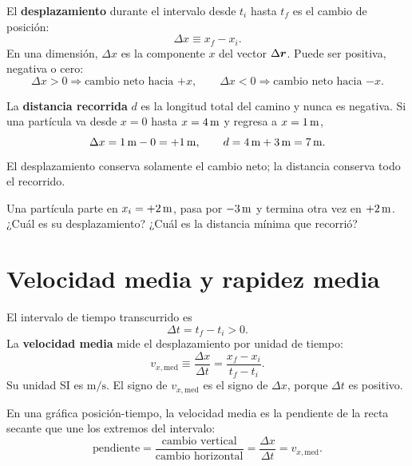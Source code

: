 \documentclass[11pt]{article}
\begin{document}
El \textbf{desplazamiento} durante el intervalo desde \(t_i\) hasta \(t_f\) es
el cambio de posición:
\[
  \Delta x
  \equiv
  x_f-x_i.
\]
En una dimensión, \(\Delta x\) es la componente \(x\) del vector
\(\Delta\boldsymbol{r}\). Puede ser positiva, negativa o cero:
\[
  \Delta x>0
  \Rightarrow
  \text{cambio neto hacia \(+x\)},
  \qquad
  \Delta x<0
  \Rightarrow
  \text{cambio neto hacia \(-x\)}.
\]

La \textbf{distancia recorrida} \(d\) es la longitud total del camino y nunca
es negativa. Si una partícula va desde \(x=0\) hasta \(x=4\,\mathrm{m}\) y
regresa a \(x=1\,\mathrm{m}\),
\[
  \Delta x=1\,\mathrm{m}-0=+1\,\mathrm{m},
  \qquad
  d=4\,\mathrm{m}+3\,\mathrm{m}=7\,\mathrm{m}.
\]
El desplazamiento conserva solamente el cambio neto; la distancia conserva
todo el recorrido.

\begin{pregunta}
Una partícula parte en \(x_i=+2\,\mathrm{m}\), pasa por
\(-3\,\mathrm{m}\) y termina otra vez en \(+2\,\mathrm{m}\).
¿Cuál es su desplazamiento? ¿Cuál es la distancia mínima que recorrió?
\end{pregunta}

\section{Velocidad media y rapidez media}

El intervalo de tiempo transcurrido es
\[
  \Delta t=t_f-t_i>0.
\]
La \textbf{velocidad media} mide el desplazamiento por unidad de tiempo:
\[
  v_{x,\mathrm{med}}
  \equiv
  \frac{\Delta x}{\Delta t}
  =
  \frac{x_f-x_i}{t_f-t_i}.
\]
Su unidad SI es \(\mathrm{m/s}\). El signo de \(v_{x,\mathrm{med}}\) es el
signo de \(\Delta x\), porque \(\Delta t\) es positivo.

En una gráfica posición-tiempo, la velocidad media es la pendiente de la recta
secante que une los extremos del intervalo:
\[
  \text{pendiente}
  =
  \frac{\text{cambio vertical}}{\text{cambio horizontal}}
  =
  \frac{\Delta x}{\Delta t}
  =
  v_{x,\mathrm{med}}.
\]

\begin{center}
\end{center}
\end{document}
